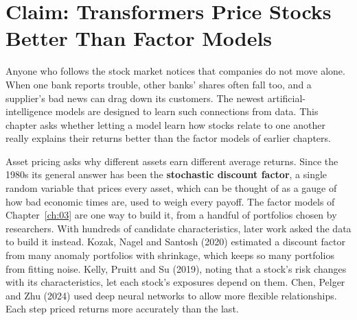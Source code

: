 \makeatletter
{}
\makeatother

\makeatletter
\makeatother

\chapter{Claim: Transformers Price Stocks Better Than Factor Models}
\label{ch:21}

Anyone who follows the stock market notices that companies do not move alone. When one bank reports trouble, other banks' shares often fall too, and a supplier's bad news can drag down its customers. The newest artificial-intelligence models are designed to learn such connections from data. This chapter asks whether letting a model learn how stocks relate to one another really explains their returns better than the factor models of earlier chapters.

Asset pricing asks why different assets earn different average returns. Since the 1980s its general answer has been the \textbf{stochastic discount factor}, a single random variable that prices every asset, which can be thought of as a gauge of how bad economic times are, used to weigh every payoff. The factor models of Chapter~\ref{ch:03} are one way to build it, from a handful of portfolios chosen by researchers. With hundreds of candidate characteristics, later work asked the data to build it instead. Kozak, Nagel and Santosh (2020) estimated a discount factor from many anomaly portfolios with shrinkage, which keeps so many portfolios from fitting noise. Kelly, Pruitt and Su (2019), noting that a stock's risk changes with its characteristics, let each stock's exposures depend on them. Chen, Pelger and Zhu (2024) used deep neural networks to allow more flexible relationships. Each step priced returns more accurately than the last.

